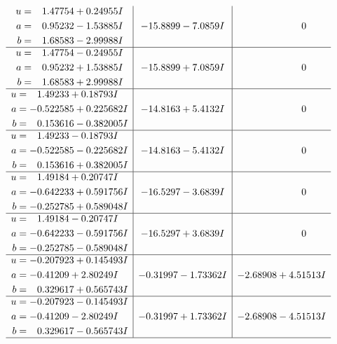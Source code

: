 \documentclass[1p]{elsarticle_modified}
\theoremstyle{definition}
\begin{document}
$$\begin{array}{c|c|c}
\begin{aligned}
u &= \phantom{-}1.47754 + 0.24955 I \\
a &= \phantom{-}0.95232 - 1.53885 I \\
b &= \phantom{-}1.68583 - 2.99988 I\end{aligned}
 & -15.8899 - 7.0859 I & \phantom{-0.000000 } 0 \\ \hline\begin{aligned}
u &= \phantom{-}1.47754 - 0.24955 I \\
a &= \phantom{-}0.95232 + 1.53885 I \\
b &= \phantom{-}1.68583 + 2.99988 I\end{aligned}
 & -15.8899 + 7.0859 I & \phantom{-0.000000 } 0 \\ \hline\begin{aligned}
u &= \phantom{-}1.49233 + 0.18793 I \\
a &= -0.522585 + 0.225682 I \\
b &= \phantom{-}0.153616 - 0.382005 I\end{aligned}
 & -14.8163 + 5.4132 I & \phantom{-0.000000 } 0 \\ \hline\begin{aligned}
u &= \phantom{-}1.49233 - 0.18793 I \\
a &= -0.522585 - 0.225682 I \\
b &= \phantom{-}0.153616 + 0.382005 I\end{aligned}
 & -14.8163 - 5.4132 I & \phantom{-0.000000 } 0 \\ \hline\begin{aligned}
u &= \phantom{-}1.49184 + 0.20747 I \\
a &= -0.642233 + 0.591756 I \\
b &= -0.252785 + 0.589048 I\end{aligned}
 & -16.5297 - 3.6839 I & \phantom{-0.000000 } 0 \\ \hline\begin{aligned}
u &= \phantom{-}1.49184 - 0.20747 I \\
a &= -0.642233 - 0.591756 I \\
b &= -0.252785 - 0.589048 I\end{aligned}
 & -16.5297 + 3.6839 I & \phantom{-0.000000 } 0 \\ \hline\begin{aligned}
u &= -0.207923 + 0.145493 I \\
a &= -0.41209 + 2.80249 I \\
b &= \phantom{-}0.329617 + 0.565743 I\end{aligned}
 & -0.31997 - 1.73362 I & -2.68908 + 4.51513 I \\ \hline\begin{aligned}
u &= -0.207923 - 0.145493 I \\
a &= -0.41209 - 2.80249 I \\
b &= \phantom{-}0.329617 - 0.565743 I\end{aligned}
 & -0.31997 + 1.73362 I & -2.68908 - 4.51513 I\\
 \hline 
 \end{array}$$\newpage\newpage\renewcommand{\arraystretch}{1}
\end{document}
